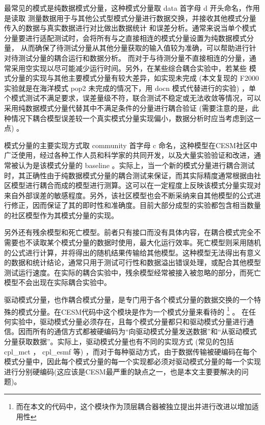 最常见的模式是纯数据模式分量，这种模式分量取 data 首字母 d 开头命名，作用是读取
测量数据用于与其他公式型模式分量进行数据交换，并接收其他模式分量传入的数据与真实数据进行对比做出数据统计
和误差分析。通常来说当单个模式分量要进行适配测试时，会将所有与之直接相连的模式分量设置为纯数据模式分量，
从而确保了待测试分量从其他分量获取的输入值较为准确，可以帮助进行针对待测试分量的耦合运行和数据分析。
而对于与待测分量不直接相连的分量，通常采用空实现以尽可能减少运行时间。另外，在某些综合耦合实验中，若某些
模式分量的实现与其他主要模式分量有较大差异，如实现未完成
(本文复现的 F2000 实验就是在海洋模式 pop2 未完成的情况下，用 docn 模式代替进行的实验)
，单个模式测试不满足要求，误差量级不符，联合测试不稳定或无法收敛等情况，可以采用纯数据模式分量代替其中不满足条件的分量进行耦合验证
(需要注意的是，此种情况下耦合模型误差较一个真实模式分量实现偏小，数据分析时应当考虑到这一点)
。

模式分量的主要实现方式取 community 首字母 c 命名，这种模型在CESM社区中广泛使用，经过各种工作人员和科学家的共同开发，以及大量实验验证和改进，通常被认为是该模式分量的 baseline 。实际上，当一个新的模式分量进行耦合测试时，其正确性由于纯数据模式分量的耦合测试来保证，而其实际精度通常根据由社区模型进行耦合而成的模型进行测算。这可以在一定程度上反映该模式分量实现对来自外部误差的敏感程度。另外，该社区模型也会不断采纳来自其他模型的公式进行修正，因而保证了其的即时性和准确度。目前大部分成型的实验都包含相当数量的社区模型作为其模式分量的实现。

另外还有残余模型和死亡模型。前者只有接口而没有具体内容，在耦合模式完全不需要也不读取某个模式分量的数据时使用，最大化运行效率。死亡模型则采用随机的公式进行计算，并将得出的随机结果传输给其他模型。这种模型无法得出有意义的数据和统计结论，通常只用于测试可行性和数据溢出错误处理，或配合其他模型测试运行速度。在实际的耦合实验中，残余模型经常被接入被忽略的部分，而死亡模型不会出现在实际耦合实验中。

驱动模式分量，也作耦合模式分量，是专门用于各个模式分量的数据交换的一个特殊的模式分量。在CESM代码中这个模块是作为一个模式分量来看待的
\footnote {而在本文的代码中，这个模块作为顶层耦合器被独立提出并进行改进以增加适用性}
。
在任何实验中，驱动模式分量必须存在，且每个模式分量都只和驱动模式分量进行通信。因而所有的通信方式都被硬编码为“向驱动模式分量发送数据”和“从驱动模式分量获取数据”。实际上，驱动模式分量也有不同的实现方式
(常见的包括 cpl\_mct ， cpl\_esmf 等)
，而对于每种驱动方式，由于数据传输被硬编码在每个模式分量中，因此每个模式分量的每一个实现都必须对驱动模式分量的每一个实现进行分别硬编码(这应该是CESM最严重的缺点之一，也是本文主要要解决的问题)。

